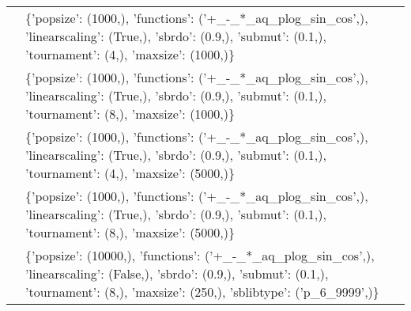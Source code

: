 \begin{tabular}{l p{37em}}
              &                                                                                                                             \{'popsize': (1000,), 'functions': ('+\_-\_*\_aq\_plog\_sin\_cos',), 'linearscaling': (True,), 'sbrdo': (0.9,), 'submut': (0.1,), 'tournament': (4,), 'maxsize': (1000,)\} \\
              &                                                                                                                             \{'popsize': (1000,), 'functions': ('+\_-\_*\_aq\_plog\_sin\_cos',), 'linearscaling': (True,), 'sbrdo': (0.9,), 'submut': (0.1,), 'tournament': (8,), 'maxsize': (1000,)\} \\
              &                                                                                                                             \{'popsize': (1000,), 'functions': ('+\_-\_*\_aq\_plog\_sin\_cos',), 'linearscaling': (True,), 'sbrdo': (0.9,), 'submut': (0.1,), 'tournament': (4,), 'maxsize': (5000,)\} \\
              &                                                                                                                             \{'popsize': (1000,), 'functions': ('+\_-\_*\_aq\_plog\_sin\_cos',), 'linearscaling': (True,), 'sbrdo': (0.9,), 'submut': (0.1,), 'tournament': (8,), 'maxsize': (5000,)\} \\
              &                                                                                                \{'popsize': (10000,), 'functions': ('+\_-\_*\_aq\_plog\_sin\_cos',), 'linearscaling': (False,), 'sbrdo': (0.9,), 'submut': (0.1,), 'tournament': (8,), 'maxsize': (250,), 'sblibtype': ('p\_6\_9999',)\} \\
\bottomrule
\end{tabular}